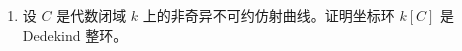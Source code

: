 \begin{enumerate}
（d）若 \(F_2 = \mathbb{Q}(\sqrt{-5})\)，证明 \(P_3 = (3, 1+\sqrt{-5}) = (3, 5-\sqrt{-5})\) 是 \(\mathcal{O}_{F_2}\) 中非主的素理想，且 \(\mathcal{O}_K = \mathcal{O}_{F_2}\cdot 1+(1/3)P_3\cdot\omega\).〔验证 \(\sqrt{-10} = -(5-\sqrt{-5})\omega/3\).〕由此证明作为 \(\mathcal{O}_{F_2}\)-模，\(\mathcal{O}_K\) 的 Steinitz 类是 \(\mathcal{O}_{F_2}\) 的类群中 \(P_3\) 的非平凡类，故 \(\mathcal{O}_K\) 在 \(\mathcal{O}_{F_2}\) 上没有相对整基。

（e）判断 \(\mathcal{O}_K\) 在 \(K\) 的剩余二次子域 \(F_3 = \mathbb{Q}(\sqrt{-10})\) 的整数环上是否有相对整基。

\item 设 \(C\) 是代数闭域 \(k\) 上的非奇异不可约仿射曲线。证明坐标环 \(k[C]\) 是 Dedekind 整环。
\end{enumerate}
